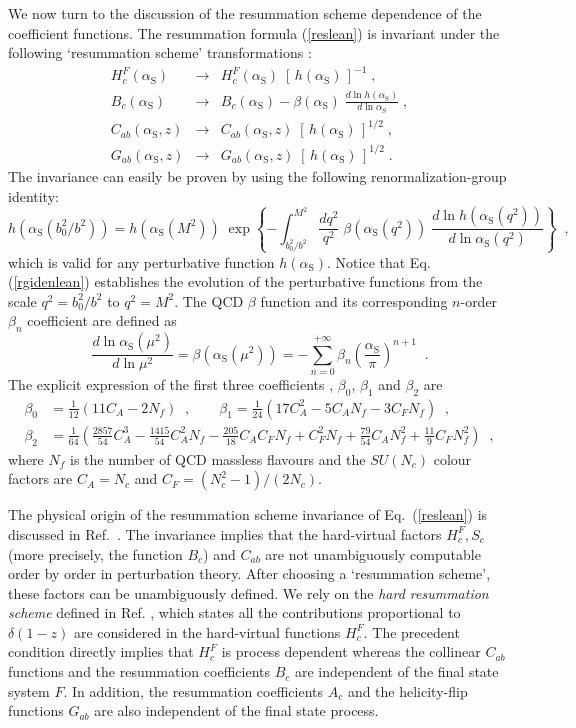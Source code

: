 \documentclass[12pt]{article}
\def\beeq{\begin{eqnarray}}
\def\eeeq{\end{eqnarray}}
\def\nn{\nonumber}
\newcommand\as{\alpha_{\mathrm{S}}}
\newcommand\f[2]{\frac{#1}{#2}}
\def\to{\rightarrow}
\begin{document}
We now turn to the discussion of the resummation scheme dependence of the coefficient functions.
The resummation formula (\ref{reslean}) is invariant under the following `resummation scheme'  transformations \cite{Catani:2000vq}:
\beeq
H_c^{F}(\as) & \to & H_c^{F}(\as) \; \left[ \, h(\as) \, \right]^{-1}
\;, \nn \\
\label{restranf}
B_c(\as) & \to & B_c(\as) - \beta(\as) \;\frac{d\ln h(\as)}{d\ln \as} 
\;,\\
C_{ab}(\as,z) & \to & C_{ab}(\as,z) \;
\left[ \, h(\as) \, \right]^{1/2} \;,\nn\\
G_{ab}(\as,z) & \to & G_{ab}(\as,z) \;
\left[ \, h(\as) \, \right]^{1/2} \;. \nn
\eeeq
The invariance can easily be proven by using the following renormalization-group identity:
\begin{equation}
\label{rgidenlean}
h(\as(b_0^2/b^2)) = h(\as(M^2)) \; \exp \left\{ 
-\int_{b_0^2/b^2}^{M^2} \frac{dq^2}{q^2} 
\;\beta(\as(q^2)) \;\frac{d \ln h(\as(q^2))}{d \ln \as(q^2)} 
\right\} \;\;,
\end{equation}
which is valid for any perturbative function $h(\as)$. Notice that Eq. (\ref{rgidenlean}) establishes the evolution of the perturbative functions from the scale $q^{2}=b_0^2/b^2$ to $q^{2}=M^2$. The QCD $\beta$ function and its corresponding $n$-order $\beta_n$ coefficient are defined as
\begin{equation}
\label{rge}
\f{d \ln \as(\mu^2)}{d \ln \mu^2} = \beta(\as(\mu^2)) = 
- \sum_{n=0}^{+\infty} \beta_n \left( \f{\as}{\pi} \right)^{n+1}\;\;.
\end{equation}
The explicit expression of the first three coefficients \cite{Tarasov:1980au,Larin:1993tp}, $\beta_0$, $\beta_1$ and
$\beta_2$ are
\begin{align}
\beta_0 &= \frac{1}{12} \left( 11 C_A - 2 N_f \right) \;\;,
\quad\quad \beta_1=  \frac{1}{24} 
\left( 17 C_A^2 - 5 C_A N_f - 3 C_F N_f \right) \;\;,\nn\\
\beta_2 &= \frac{1}{64} \left( \f{2857}{54} C_A^3
- \f{1415}{54} C_A^2 N_f - \f{205}{18} C_A C_F N_f + C_F^2 N_f
+ \f{79}{54} C_A N_f^2 + \f{11}{9} C_F N_f^2 \right) \;\;,
\end{align}
where $N_f$ is the number of QCD massless flavours and the $SU(N_c)$ colour factors are $C_A=N_c$  and $C_F=(N_c^2-1)/(2N_c)$.

The physical origin of the  resummation scheme invariance of Eq.~(\ref{reslean}) is discussed in  Ref.~\cite{Catani:2000vq}. 
The invariance implies that the hard-virtual factors $H_c^{F}, S_c$ (more precisely, the function $B_c$)  and $C_{ab}$ are not unambiguously computable order by order in perturbation theory. After choosing a `resummation scheme', these factors can be unambiguously defined. We rely on the \textit{hard resummation scheme} defined in Ref. \cite{Catani:2013tia}, which states all the contributions proportional to $\delta(1-z)$ are considered in the hard-virtual functions $H_c^{F}$. The precedent condition directly implies that $H_c^{F}$ is process dependent whereas the collinear $C_{ab}$ functions and the resummation coefficients $B_{c}$ are independent of the final state system $F$. In addition, the resummation coefficients $A_{c}$ and the helicity-flip functions $G_{ab}$ are also independent of the final state process.
\end{document}
